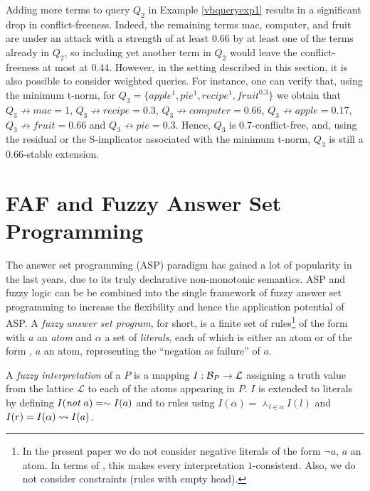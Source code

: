 \documentclass[12pt,a4paper]{article}
\newcommand{\mc}[1]{\ensuremath{\mathcal{#1}}}
\newcommand{\attack}{\ensuremath{\not\rightarrow}}
\newcommand{\Lattice}{\ensuremath{\mc{L}}}
\newcommand{\fand}{\ensuremath{\curlywedge}}
\newcommand{\fneg}{\ensuremath{\sim}}
\begin{document}
\begin{example}\label{vbqueryexp2}
Adding more terms to query $Q_2$ in Example \ref{vbqueryexp1} results in a significant drop in conflict-freeness. Indeed, the remaining terms mac, computer, and fruit are under an attack with a strength of at least 0.66 by at least one of the terms already in $Q_2$, so including yet another term in $Q_2$ would leave the conflict-freeness at most at 0.44. However, in the setting described in this section, it is also possible to consider weighted queries. For instance, one can verify that, using the minimum t-norm, for $Q_3 = \{apple^1, pie^1, recipe^1, fruit^{0.3}\}$ we obtain that
$Q_3 \attack mac = 1$, $Q_3 \attack recipe = 0.3$, $Q_3 \attack computer = 0.66$, $Q_3 \attack apple = 0.17$, $Q_3 \attack fruit = 0.66$ and $Q_3 \attack pie = 0.3$. Hence, $Q_3$ is $0.7$-conflict-free, and, using the residual or the S-implicator associated with the minimum t-norm, $Q_3$ is still a $0.66$-stable extension.
\end{example}

%
%

\section{FAF and Fuzzy Answer Set Programming}\label{sec-fasp}

The answer set programming (ASP) paradigm\cite{BaralBook} has gained a lot of popularity in the last years, due to its truly declarative non-monotonic semantics. ASP and fuzzy logic can be be combined into the single framework of fuzzy answer set programming to increase the flexibility and hence the application potential of ASP.
A \emph{fuzzy answer set program}\cite{fasp0}, \abfasp{} for short, is
a finite set of rules\footnote{
  In the present paper we do not consider negative
  literals of the form $\neg a$, $a$ an atom. In terms
  of \cite{fasp0}, this makes every interpretation $1$-consistent.
  Also, we do not consider constraints (rules with empty head).}
of the form  with $a$ an \emph{atom}
and $\alpha$ a set of \emph{literals}, %
each of which
is either an atom or of the form , $a$ an atom,
representing the ``negation as failure'' of $a$.

A \emph{fuzzy interpretation} of a \abfasp{} $P$ is a mapping 
$I: \hbase{P} \rightarrow \Lattice{}$ assigning a truth value
from the lattice \Lattice{} to each of the atoms appearing in $P$.
$I$ is extended to literals by defining $I(\naf{a}) = \fneg I(a)$
and to rules  using 
$I(\alpha) = \fand_{l\in\alpha} I(l)$ and 
$I(r) = {I(\alpha)}\rightsquigarrow{I(a)}$. 
\end{document}

